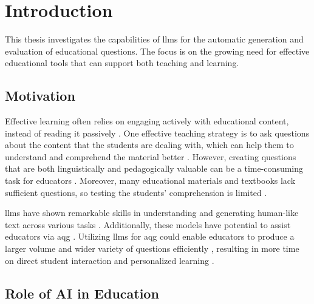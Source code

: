 \section{Introduction}

This thesis investigates the capabilities of \acp{llm} for the automatic generation and evaluation of educational questions. The focus is on the growing need for effective educational tools that can support both teaching and learning.

\subsection{Motivation}

Effective learning often relies on engaging actively with educational content, instead of reading it passively \cite{steuer_i_2021}. One effective teaching strategy is to ask questions about the content that the students are dealing with, which can help them to understand and comprehend the material better \cite{steuer_i_2021}. However, creating questions that are both linguistically and pedagogically valuable can be a time-consuming task for educators \cite{steuer_i_2021,vu_chatgpt-based_2024}. Moreover, many educational materials and textbooks lack sufficient questions, so testing the students' comprehension is limited \cite{steuer_i_2021}.

\acp{llm} have shown remarkable skills in understanding and generating human-like text across various tasks \cite{wang_history_2024}. 
Additionally, these models have potential to assist educators via \ac{aqg} \cite{vu_chatgpt-based_2024,ling_automatic_2024}. Utilizing \acp{llm} for \ac{aqg} could enable educators to produce a larger volume and wider variety of questions efficiently \cite{scaria_how_2024,hang_mcqgen_2024}, 
resulting in more time on direct student interaction \cite{doughty_comparative_2024,al_faraby_analysis_2024} and personalized learning \cite{ling_automatic_2024}.

\subsection{Role of AI in Education}

